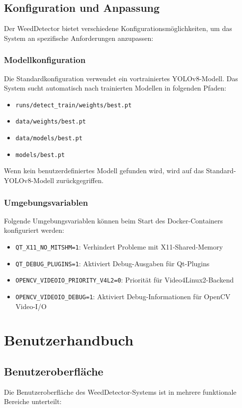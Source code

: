 \documentclass[12pt, a4paper]{scrreprt}
\begin{document}
\section{Konfiguration und Anpassung}
Der WeedDetector bietet verschiedene Konfigurationsmöglichkeiten, um das System an spezifische Anforderungen anzupassen:

\subsection{Modellkonfiguration}
Die Standardkonfiguration verwendet ein vortrainiertes YOLOv8-Modell. Das System sucht automatisch nach trainierten Modellen in folgenden Pfaden:
\begin{itemize}
    \item \texttt{runs/detect\_train/weights/best.pt}
    \item \texttt{data/weights/best.pt}
    \item \texttt{data/models/best.pt}
    \item \texttt{models/best.pt}
\end{itemize}

Wenn kein benutzerdefiniertes Modell gefunden wird, wird auf das Standard-YOLOv8-Modell zurückgegriffen.

\subsection{Umgebungsvariablen}
Folgende Umgebungsvariablen können beim Start des Docker-Containers konfiguriert werden:
\begin{itemize}
    \item \texttt{QT\_X11\_NO\_MITSHM=1}: Verhindert Probleme mit X11-Shared-Memory
    \item \texttt{QT\_DEBUG\_PLUGINS=1}: Aktiviert Debug-Ausgaben für Qt-Plugins
    \item \texttt{OPENCV\_VIDEOIO\_PRIORITY\_V4L2=0}: Priorität für Video4Linux2-Backend
    \item \texttt{OPENCV\_VIDEOIO\_DEBUG=1}: Aktiviert Debug-Informationen für OpenCV Video-I/O
\end{itemize}

\chapter{Benutzerhandbuch}

\section{Benutzeroberfläche}
Die Benutzeroberfläche des WeedDetector-Systems ist in mehrere funktionale Bereiche unterteilt:
\end{document}
